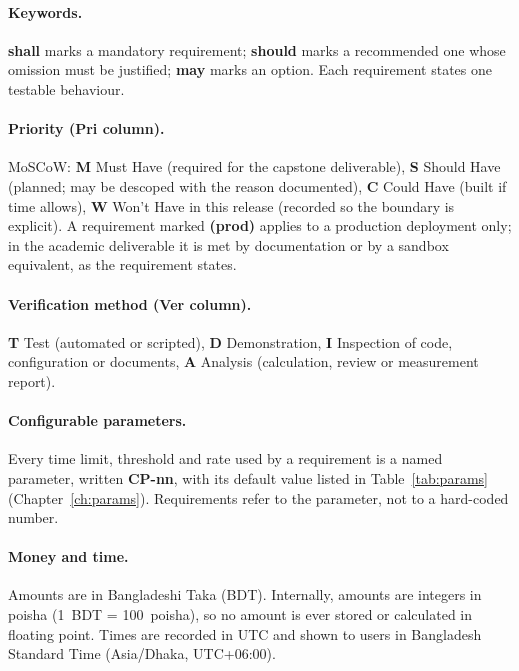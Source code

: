 \documentclass[11pt,a4paper]{report}
\begin{document}
\paragraph{Keywords.} \textbf{shall} marks a mandatory requirement; \textbf{should} marks a recommended one whose omission must be justified; \textbf{may} marks an option. Each requirement states one testable behaviour.

\paragraph{Priority (Pri column).} MoSCoW: \textbf{M} Must Have (required for the capstone deliverable), \textbf{S} Should Have (planned; may be descoped with the reason documented), \textbf{C} Could Have (built if time allows), \textbf{W} Won't Have in this release (recorded so the boundary is explicit). A requirement marked \textbf{(prod)} applies to a production deployment only; in the academic deliverable it is met by documentation or by a sandbox equivalent, as the requirement states.

\paragraph{Verification method (Ver column).} \textbf{T} Test (automated or scripted), \textbf{D} Demonstration, \textbf{I} Inspection of code, configuration or documents, \textbf{A} Analysis (calculation, review or measurement report).

\paragraph{Configurable parameters.} Every time limit, threshold and rate used by a requirement is a named parameter, written \textbf{CP-nn}, with its default value listed in Table~\ref{tab:params} (Chapter~\ref{ch:params}). Requirements refer to the parameter, not to a hard-coded number.

\paragraph{Money and time.} Amounts are in Bangladeshi Taka (BDT). Internally, amounts are integers in poisha (1~BDT = 100~poisha), so no amount is ever stored or calculated in floating point. Times are recorded in UTC and shown to users in Bangladesh Standard Time (Asia/Dhaka, UTC+06:00).
\end{document}
